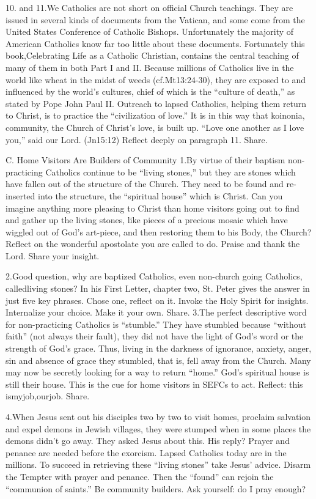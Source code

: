 \documentclass[oneside]{book}
\begin{document}
10. and 11.We Catholics are not short on official Church teachings. They are
issued in several kinds of documents from the Vatican, and some come from the
United States Conference of Catholic Bishops. Unfortunately the majority of
American Catholics know far too little about these documents.
Fortunately this book,Celebrating Life as a Catholic Christian, contains the
central teaching of many of them in both Part I and II. Because millions of
Catholics live in the world like wheat in the midst of weeds (cf.Mt13:24-30),
they are exposed to and influenced by the world's cultures, chief of which is
the ``culture of death,'' as stated by Pope John Paul II. Outreach to lapsed
Catholics, helping them return to Christ, is to practice the ``civilization of
love.'' It is in this way that koinonia, community, the Church of Christ's love,
is built up. ``Love one another as I love you,'' said our Lord. (Jn15:12)
Reflect deeply on paragraph 11. Share.

C. Home Visitors Are Builders of Community
1.By virtue of their baptism non-practicing Catholics continue to be ``living
stones,'' but they are stones which have fallen out of the structure of the
Church. They need to be found and re-inserted into the structure, the
``spiritual house'' which is Christ. Can you imagine anything more pleasing to
Christ than home visitors going out to find and gather up the living stones,
like pieces of a precious mosaic which have wiggled out of God's art-piece, and
then restoring them to his Body, the Church? Reflect on the wonderful apostolate
you are called to do. Praise and thank the Lord. Share your insight.

2.Good question, why are baptized Catholics, even non-church going Catholics,
calledliving stones? In his First Letter, chapter two, St. Peter gives the
answer in just five key phrases. Chose one, reflect on it. Invoke the Holy
Spirit for insights. Internalize your choice. Make it your own. Share.
3.The perfect descriptive word for non-practicing Catholics is ``stumble.'' They
have stumbled because ``without faith'' (not always their fault), they did not
have the light of God's word or the strength of God's grace. Thus, living in the
darkness of ignorance, anxiety, anger, sin and absence of grace they stumbled,
that is, fell away from the Church. Many may now be secretly looking for a way
to return ``home.'' God's spiritual house is still their house. This is the cue
for home visitors in SEFCs to act. Reflect: this ismyjob,ourjob. Share.

4.When Jesus sent out his disciples two by two to visit homes, proclaim
salvation and expel demons in Jewish villages, they were stumped when in some
places the demons didn't go away. They asked Jesus about this. His reply? Prayer
and penance are needed before the exorcism. Lapsed Catholics today are in the
millions. To succeed in retrieving these ``living stones'' take Jesus'
advice. Disarm the Tempter with prayer and penance. Then the ``found'' can
rejoin the ``communion of saints.'' Be community builders. Ask yourself: do I
pray enough?
\end{document}
